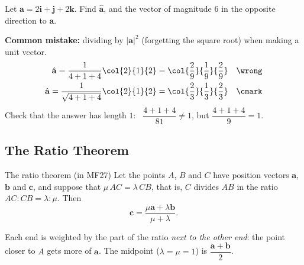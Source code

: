 \begin{example}[label=ex:1.6]
Let $\mathbf{a} = 2\mathbf{i} + \mathbf{j} + 2\mathbf{k}$. Find $\hat{\mathbf{a}}$, and the vector of magnitude $6$ in the opposite direction to $\mathbf{a}$.
\end{example}

\begin{mistake}
\textbf{Common mistake:} dividing by $|\mathbf{a}|^{2}$ (forgetting the square root) when making a unit vector.
\begin{align*}
\hat{\mathbf{a}} = \dfrac{1}{4+1+4}\col{2}{1}{2} = \col{\dfrac{2}{9}}{\dfrac{1}{9}}{\dfrac{2}{9}} & & \wrong \\
\hat{\mathbf{a}} = \dfrac{1}{\sqrt{4+1+4}}\col{2}{1}{2} = \col{\dfrac{2}{3}}{\dfrac{1}{3}}{\dfrac{2}{3}} & & \cmark
\end{align*}
Check that the answer has length $1$: \ $\dfrac{4+1+4}{81}\neq 1$, but $\dfrac{4+1+4}{9} = 1$.
\end{mistake}

\clearpage
\subsection{The Ratio Theorem}
\begin{definition}{The ratio theorem (in MF27)}
Let the points $A$, $B$ and $C$ have position vectors $\mathbf{a}$, $\mathbf{b}$ and $\mathbf{c}$, and suppose that $\mu\,AC = \lambda\,CB$, that is, $C$ divides $AB$ in the ratio $AC:CB = \lambda:\mu$. Then
\[
\mathbf{c} = \dfrac{\mu\mathbf{a} + \lambda\mathbf{b}}{\mu + \lambda}.
\]
\end{definition}
Each end is weighted by the part of the ratio \emph{next to the other end}: the point closer to $A$ gets more of $\mathbf{a}$. The midpoint ($\lambda = \mu = 1$) is $\dfrac{\mathbf{a}+\mathbf{b}}{2}$.

\begin{center}
\end{center}

